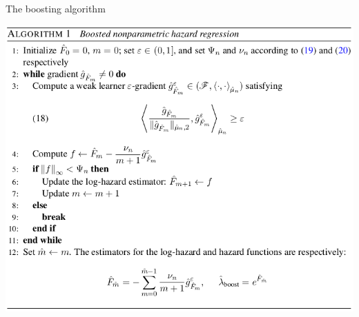 \documentclass{beamer}\usepackage{listings}
\begin{document}
\begin{frame}[label={sec:orgd9aa7e6}]{The boosting algorithm}
\begin{center}
\includegraphics[width=.9\linewidth]{./screenshots/Screenshot_algorithm.png}
\end{center}
\end{frame}
\end{document}
